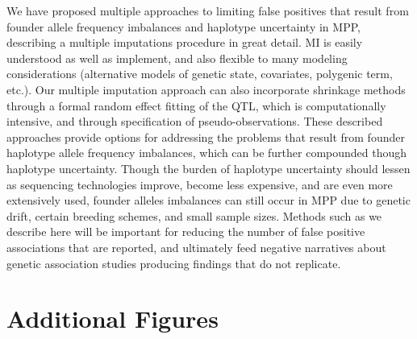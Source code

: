 We have proposed multiple approaches to limiting false positives that result from founder allele frequency imbalances and haplotype uncertainty in MPP, describing a multiple imputations procedure in great detail. MI is easily understood as well as implement, and also flexible to many modeling considerations (alternative models of genetic state, covariates, polygenic term, etc.). Our multiple imputation approach can also incorporate shrinkage methods through a formal random effect fitting of the QTL, which is computationally intensive, and through specification of pseudo-observations. These described approaches provide options for addressing the problems that result from founder haplotype allele frequency imbalances, which can be further compounded though haplotype uncertainty. Though the burden of haplotype uncertainty should lessen as sequencing technologies improve, become less expensive, and are even more extensively used, founder alleles imbalances can still occur in MPP due to genetic drift, certain breeding schemes, and small sample sizes. Methods such as we describe here will be important for reducing the number of false positive associations that are reported, and ultimately feed negative narratives about genetic association studies producing findings that do not replicate.

\newpage

\section{Additional Figures}

